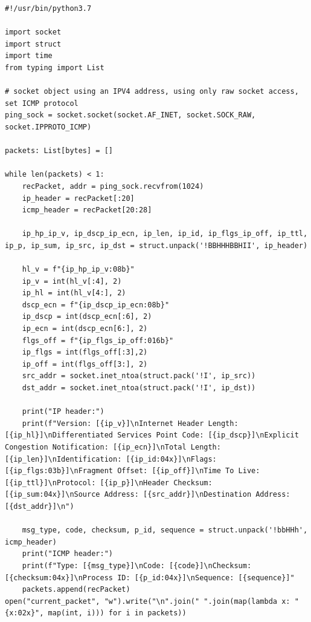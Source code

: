 \documentclass[titlepage]{article}
\begin{document}
\begin{lstlisting}[label=echorecv,caption=A prototype for receiving \gls{icmp} ECHO REQUEST packets.]
#!/usr/bin/python3.7

import socket
import struct
import time
from typing import List

# socket object using an IPV4 address, using only raw socket access, set ICMP protocol        
ping_sock = socket.socket(socket.AF_INET, socket.SOCK_RAW, socket.IPPROTO_ICMP)

packets: List[bytes] = []

while len(packets) < 1:
    recPacket, addr = ping_sock.recvfrom(1024)
    ip_header = recPacket[:20]
    icmp_header = recPacket[20:28]

    ip_hp_ip_v, ip_dscp_ip_ecn, ip_len, ip_id, ip_flgs_ip_off, ip_ttl, ip_p, ip_sum, ip_src, ip_dst = struct.unpack('!BBHHHBBHII', ip_header)

    hl_v = f"{ip_hp_ip_v:08b}"
    ip_v = int(hl_v[:4], 2)
    ip_hl = int(hl_v[4:], 2)
    dscp_ecn = f"{ip_dscp_ip_ecn:08b}"
    ip_dscp = int(dscp_ecn[:6], 2)
    ip_ecn = int(dscp_ecn[6:], 2)
    flgs_off = f"{ip_flgs_ip_off:016b}"
    ip_flgs = int(flgs_off[:3],2)
    ip_off = int(flgs_off[3:], 2)
    src_addr = socket.inet_ntoa(struct.pack('!I', ip_src))
    dst_addr = socket.inet_ntoa(struct.pack('!I', ip_dst))

    print("IP header:")
    print(f"Version: [{ip_v}]\nInternet Header Length: [{ip_hl}]\nDifferentiated Services Point Code: [{ip_dscp}]\nExplicit Congestion Notification: [{ip_ecn}]\nTotal Length: [{ip_len}]\nIdentification: [{ip_id:04x}]\nFlags: [{ip_flgs:03b}]\nFragment Offset: [{ip_off}]\nTime To Live: [{ip_ttl}]\nProtocol: [{ip_p}]\nHeader Checksum: [{ip_sum:04x}]\nSource Address: [{src_addr}]\nDestination Address: [{dst_addr}]\n")

    msg_type, code, checksum, p_id, sequence = struct.unpack('!bbHHh', icmp_header)
    print("ICMP header:")
    print(f"Type: [{msg_type}]\nCode: [{code}]\nChecksum: [{checksum:04x}]\nProcess ID: [{p_id:04x}]\nSequence: [{sequence}]"
    packets.append(recPacket)
open("current_packet", "w").write("\n".join(" ".join(map(lambda x: "{x:02x}", map(int, i))) for i in packets))
\end{lstlisting}
\end{document}
